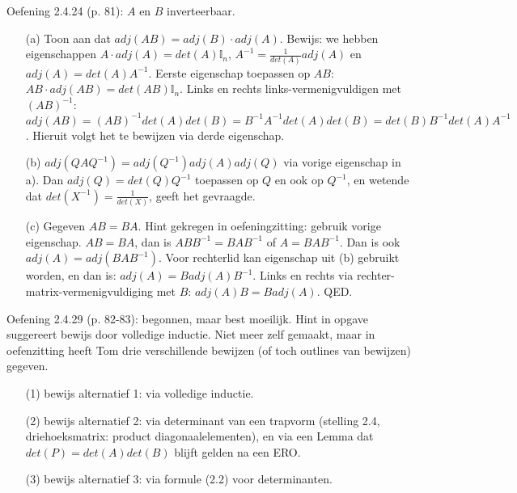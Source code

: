 \documentclass{article}
\begin{document}
Oefening 2.4.24 (p. 81): $A$ en $B$ inverteerbaar. 

\begin{enumerate}
\item[(a)] Toon aan dat $adj(AB)=adj(B) \cdot adj(A)$. Bewijs: we hebben eigenschappen $A \cdot adj(A) = det(A) \mathbb{I}_n$, $A^{-1} = \frac{1}{det(A)} adj(A)$ en $adj(A) = det(A)A^{-1}$. Eerste eigenschap toepassen op $AB$: $AB \cdot adj(AB) = det(AB) \mathbb{I}_n$. Links en rechts links-vermenigvuldigen met $(AB)^{-1}$: $adj(AB) = (AB)^{-1} det(A) det(B) = B^{-1} A^{-1} det(A) det(B) =  det(B)B^{-1} det(A)A^{-1}$. Hieruit volgt het te bewijzen via derde eigenschap. 

\item[(b)] $adj(QAQ^{-1}) = adj(Q^{-1}) adj(A) adj(Q) $ via vorige eigenschap in a). Dan $adj(Q)=det(Q) Q^{-1}$ toepassen op $Q$ en ook op $Q^{-1}$, en wetende dat $det(X^{-1}) = \frac{1}{det(X)}$, geeft het gevraagde. 

\item[(c)] Gegeven $AB=BA$. Hint gekregen in oefeningzitting: gebruik vorige eigenschap. 
$AB=BA$, dan is $ ABB^{-1} = BAB^{-1} $ of $A = BAB^{-1}$. Dan is ook  $adj(A) = adj(BAB^{-1})$. Voor rechterlid kan eigenschap uit (b) gebruikt worden, en dan is: $adj(A) = B adj(A) B^{-1}$. Links en rechts via rechter-matrix-vermenigvuldiging met $B$: $ adj(A) B = B adj(A) $. QED. 



\end{enumerate}

Oefening 2.4.29 (p. 82-83): begonnen, maar best moeilijk. Hint in opgave suggereert bewijs door volledige inductie. Niet meer zelf gemaakt, maar in oefenzitting heeft Tom drie verschillende bewijzen (of toch outlines van bewijzen) gegeven. 
\begin{enumerate}
    \item[(1)] bewijs alternatief 1: via volledige inductie. 
    \item[(2)] bewijs alternatief 2: via determinant van een trapvorm (stelling 2.4, driehoeksmatrix: product diagonaalelementen), en via een Lemma dat $det(P)=det(A)det(B)$ blijft gelden na een ERO. 
    \item[(3)] bewijs alternatief 3: via formule (2.2) voor determinanten. 
\end{enumerate}
\end{document}
